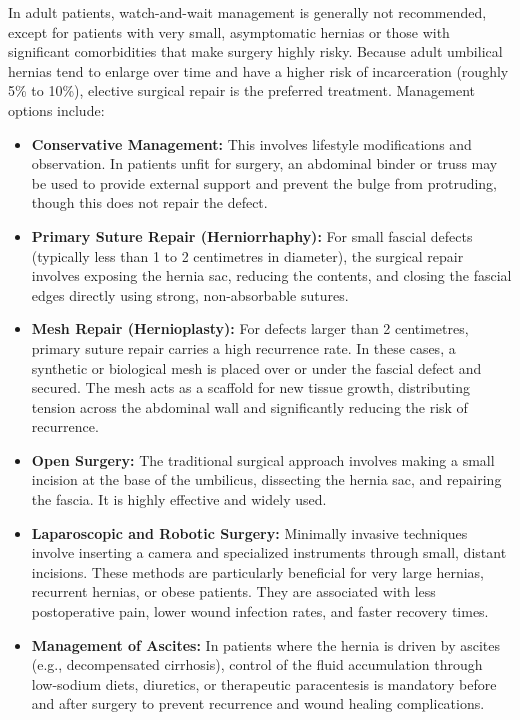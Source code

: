 In adult patients, watch-and-wait management is generally not recommended, except for patients with very small, asymptomatic hernias or those with significant comorbidities that make surgery highly risky. Because adult umbilical hernias tend to enlarge over time and have a higher risk of incarceration (roughly 5\% to 10\%), elective surgical repair is the preferred treatment. Management options include:
\begin{itemize}
    \item \textbf{Conservative Management:} This involves lifestyle modifications and observation. In patients unfit for surgery, an abdominal binder or truss may be used to provide external support and prevent the bulge from protruding, though this does not repair the defect.
    \item \textbf{Primary Suture Repair (Herniorrhaphy):} For small fascial defects (typically less than 1 to 2 centimetres in diameter), the surgical repair involves exposing the hernia sac, reducing the contents, and closing the fascial edges directly using strong, non-absorbable sutures.
    \item \textbf{Mesh Repair (Hernioplasty):} For defects larger than 2 centimetres, primary suture repair carries a high recurrence rate. In these cases, a synthetic or biological mesh is placed over or under the fascial defect and secured. The mesh acts as a scaffold for new tissue growth, distributing tension across the abdominal wall and significantly reducing the risk of recurrence.
    \item \textbf{Open Surgery:} The traditional surgical approach involves making a small incision at the base of the umbilicus, dissecting the hernia sac, and repairing the fascia. It is highly effective and widely used.
    \item \textbf{Laparoscopic and Robotic Surgery:} Minimally invasive techniques involve inserting a camera and specialized instruments through small, distant incisions. These methods are particularly beneficial for very large hernias, recurrent hernias, or obese patients. They are associated with less postoperative pain, lower wound infection rates, and faster recovery times.
    \item \textbf{Management of Ascites:} In patients where the hernia is driven by ascites (e.g., decompensated cirrhosis), control of the fluid accumulation through low-sodium diets, diuretics, or therapeutic paracentesis is mandatory before and after surgery to prevent recurrence and wound healing complications.
\end{itemize}

